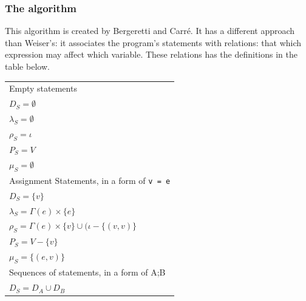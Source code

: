\documentclass[oneside,12pt,a4paper]{book}
\begin{document}
\subsubsection{The algorithm}
This algorithm is created by Bergeretti and Carré\cite{information-flow}. It has a different approach than Weiser's: it associates the program's statements with relations: that which expression may affect which variable. These relations has the definitions in the table below.
\clearpage
\begin{table}[t]
  \centering
  	\begin{tabular}{l}
Empty statements                                                                            \\
$D_S = \emptyset$                                                                           \\
$\lambda_S = \emptyset$                                                                     \\
$\rho_S = \iota$                                                                            \\
$P_S = V$                                                                                   \\
$\mu_S = \emptyset$                                                                         \\
\hline                                                                                      
Assignment Statements, in a form of \texttt{v = e}                                          \\
$D_S = \{v\}$                                                                               \\
$\lambda_S = \Gamma(e) \times \{e\}$                                                        \\
$\rho_S = \Gamma(e) \times \{v\} \cup (\iota - \{(v,v)\}$                                   \\
$P_S = V - \{v\}$                                                                           \\
$\mu_S = \{(e,v)\}$                                                                         \\
\hline                                                                                      
Sequences of statements, in a form of A;B                                                   \\
$D_S = D_A \cup D_B$                                                                        \\

\end{tabular}
\end{table}
\end{document}
